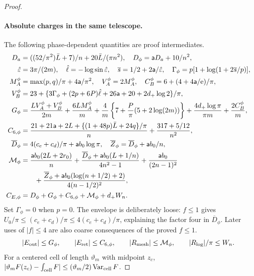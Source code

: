 \begin{proof}
\paragraph{Absolute charges in the same telescope.}
The following phase-dependent quantities are proof intermediates.
\begin{align}\label{uc:phase-allowance}
 D_a&=((52/\pi^2)\bar{L}+7)/n+20\bar{L}/(\pi n^2),\quad
 D_\phi=\mathsf{a}D_a+10/n^2,\notag\\
 \hat{\varepsilon}&=3\pi/(2m),\quad \hat{\ell}=-\log\sin\hat{\varepsilon},\quad
 \overline s=1/2+2\mathsf{a}/\hat{\varepsilon},\quad
 \Gamma_\phi=p[1+\log(1+2\overline s/p)],\notag\\
 M_A^\phi&=\max(p,q)/\pi+4\mathsf{a}/\pi^2,\quad V_A^\phi=2M_A^\phi,
 \quad C_B^\phi=6+(4+4\mathsf{a}/\mathrm e)/\pi,\notag\\
 V_B^\phi&=23+\{3\Gamma_\phi+(2p+6P)\hat{\ell}+26\mathsf{a}+20+2d_+\log2\}/\pi,
 \notag\\
 G_\phi&=\frac{LV_A^\phi+V_B^\phi}{2m}+\frac{6LM_A^\phi}{m}
 +\frac4m\left\{7+\frac P\pi(5+2\log(2m))\right\}
 +\frac{4d_+\log\pi}{\pi m}+\frac{2C_B^\phi}{m},\notag\\
 C_{6,\phi}&=\frac{21+21\mathsf{a}+2L+\{(1+48p)\bar{L}+24q\}/\pi}{n}
                         +\frac{317+5/12}{n^2},\notag\\
 \overline D_\phi&=4(c_e+c_d)/\pi+\mathsf{a}b_0\log\pi,\quad
 \overline Z_\phi=\overline D_\phi+\mathsf{a}b_0/n,\notag\\
 \mathcal M_\phi&=\frac{\mathsf{a}b_0(2L+2r_0)}n
 +\frac{\overline D_\phi+\mathsf{a}b_0(L+1/n)}{4n^2-1}
 +\frac{\mathsf{a}b_0}{(2n-1)^2}\notag\\
 &\qquad+\frac{\overline Z_\phi+\mathsf{a}b_0(\log(n+1/2)+2)}{4(n-1/2)^2},\notag\\
 C_{E,\phi}&=D_\phi+G_\phi+C_{6,\phi}+\mathcal M_\phi+d_+W_n.
\end{align}
Set $\Gamma_\phi=0$ when $p=0$.
The envelope is deliberately loose: $f\leq1$ gives
$U_0/\pi\leq(c_e+c_d)/\pi\leq4(c_e+c_d)/\pi$, explaining the
factor four in $\overline D_\phi$. Later uses of $|f|\leq4$ are
also coarse consequences of the proved $f\leq1$.
\begin{equation}\label{uc:absolute-components}
 |E_{\rm out}|\leq G_\phi,\qquad |E_{\rm ret}|\leq C_{6,\phi},
 \qquad |R_{\rm mesh}|\leq\mathcal M_\phi,
 \qquad |R_{\log}|/\pi\leq W_n.
\end{equation}
For a centered cell of length $\vartheta_m$ with midpoint $z_c$,
$|\vartheta_m F(z_c)-\int_{\rm cell}F|\leq(\vartheta_m/2)\operatorname{Var}_{\rm cell}F$.

\end{proof}
